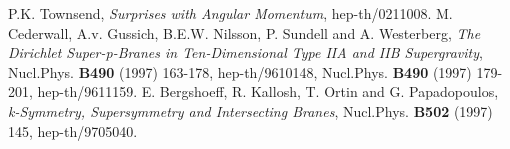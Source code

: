 \documentclass[a4paper,12pt]{article}
\begin{document}
\begin{thebibliography}{99}
P.K. Townsend, {\it Surprises with Angular Momentum}, 
hep-th/0211008. 
M. Cederwall, A.v. Gussich, B.E.W. Nilsson, P. Sundell and A. Westerberg, {\it The Dirichlet Super-p-Branes in Ten-Dimensional Type IIA and IIB Supergravity}, Nucl.Phys. {\bf B490} (1997) 163-178, hep-th/9610148, Nucl.Phys. {\bf B490} (1997) 179-201, hep-th/9611159.
E. Bergshoeff, R. Kallosh, T. Ortin and G. Papadopoulos, {\it k-Symmetry, Supersymmetry and Intersecting Branes},  Nucl.Phys. {\bf B502} (1997) 145, hep-th/9705040.





\end{thebibliography}
\end{document}
